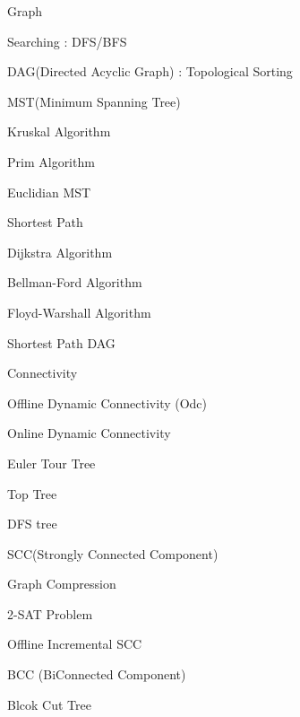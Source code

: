\documentclass[portrait, 8pt, a4paper, oneside, twocolumn]{extarticle}
\begin{document}
\begin{tcolorbox}[breakable, enhanced, sharp corners, colback=white, colframe=black, boxrule=1pt, left=0pt]
\begin{IdeaNote}
\item Graph
    \begin{IdeaNote}
    \item Searching : DFS/BFS
    \item DAG(Directed Acyclic Graph) : Topological Sorting
    \item MST(Minimum Spanning Tree)
        \begin{IdeaNote}
        \item Kruskal Algorithm
        \item Prim Algorithm
        \item Euclidian MST
        \end{IdeaNote}
    \item Shortest Path
        \begin{IdeaNote}
        \item Dijkstra Algorithm
        \item Bellman-Ford Algorithm
        \item Floyd-Warshall Algorithm
        \item Shortest Path DAG
        \end{IdeaNote}
    \item Connectivity
        \begin{IdeaNote}
        \item Offline Dynamic Connectivity (Odc)
        \item Online Dynamic Connectivity
            \begin{IdeaNote}
            \item Euler Tour Tree
            \item Top Tree
            \end{IdeaNote}
        \end{IdeaNote}
    \item DFS tree
        \begin{IdeaNote}
        \item SCC(Strongly Connected Component)
            \begin{IdeaNote}
            \item Graph Compression
            \item 2-SAT Problem
            \item Offline Incremental SCC
            \end{IdeaNote}
        \item BCC (BiConnected Component)
            \begin{IdeaNote}
            \item Blcok Cut Tree

\end{IdeaNote}
\end{IdeaNote}
\end{IdeaNote}
\end{IdeaNote}
\end{tcolorbox}
\end{document}
